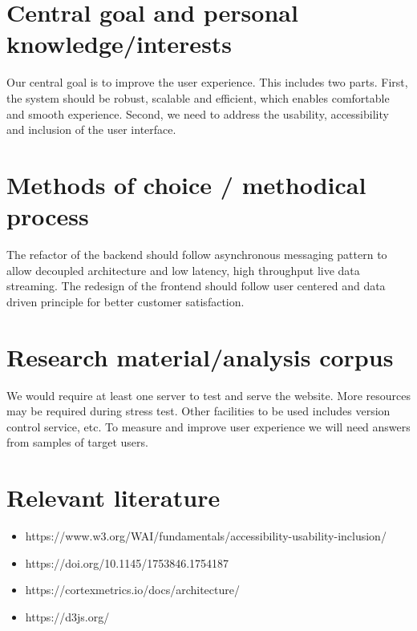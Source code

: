 \documentclass[12pt]{scrartcl}
\begin{document}
\section*{Central goal and personal knowledge/interests} %

Our central goal is to improve the user experience. This includes two parts. First, the system should be robust, scalable and efficient, which enables comfortable and smooth experience. Second, we need to address the usability, accessibility and inclusion of the user interface.

\section*{Methods of choice / methodical process} %


The refactor of the backend should follow asynchronous messaging pattern to allow decoupled architecture and low latency, high throughput live data streaming. The redesign of the frontend should follow user centered and data driven principle for better customer satisfaction.

\section*{Research material/analysis corpus} %

We would require at least one server to test and serve the website. More resources may be required during stress test. Other facilities to be used includes version control service, etc. To measure and improve user experience we will need answers from samples of target users.

\section*{Relevant literature} %

\begin{itemize}
    \item https://www.w3.org/WAI/fundamentals/accessibility-usability-inclusion/
    \item https://doi.org/10.1145/1753846.1754187
    \item https://cortexmetrics.io/docs/architecture/ %
    \item https://d3js.org/ %
\end{itemize}
\end{document}

